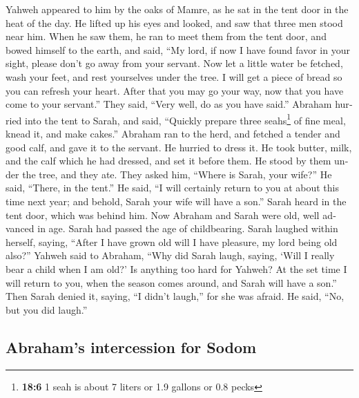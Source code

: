 \begin{paracol}{2}
\begin{otherlanguage}{english}
 Yahweh appeared to him by the oaks of Mamre, as he sat in
the tent door in the heat of the day.  He lifted up his
eyes and looked, and saw that three men stood near him. When he saw
them, he ran to meet them from the tent door, and bowed himself to the
earth,  and said, ``My lord, if now I have found favor in
your sight, please don't go away from your servant.  Now
let a little water be fetched, wash your feet, and rest yourselves under
the tree.  I will get a piece of bread so you can refresh
your heart. After that you may go your way, now that you have come to
your servant.'' They said, ``Very well, do as you have said.''
 Abraham hurried into the tent to Sarah, and said,
``Quickly prepare three seahs\footnote{\textbf{18:6} 1 seah is about 7
  liters or 1.9 gallons or 0.8 pecks} of fine meal, knead it, and make
cakes.''  Abraham ran to the herd, and fetched a tender
and good calf, and gave it to the servant. He hurried to dress it.
 He took butter, milk, and the calf which he had dressed,
and set it before them. He stood by them under the tree, and they ate.
 They asked him, ``Where is Sarah, your wife?'' He said,
``There, in the tent.''  He said, ``I will certainly
return to you at about this time next year; and behold, Sarah your wife
will have a son.'' Sarah heard in the tent door, which was behind him.
 Now Abraham and Sarah were old, well advanced in age.
Sarah had passed the age of childbearing.  Sarah laughed
within herself, saying, ``After I have grown old will I have pleasure,
my lord being old also?''  Yahweh said to Abraham, ``Why
did Sarah laugh, saying, `Will I really bear a child when I am old?'
 Is anything too hard for Yahweh? At the set time I will
return to you, when the season comes around, and Sarah will have a
son.''  Then Sarah denied it, saying, ``I didn't laugh,''
for she was afraid. He said, ``No, but you did laugh.''

\hypertarget{abrahams-intercession-for-sodom}{%
\subsection{Abraham's intercession for
Sodom}\label{abrahams-intercession-for-sodom}}


\end{otherlanguage}
\end{paracol}
